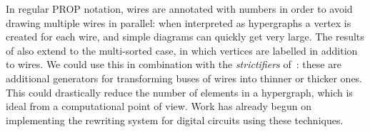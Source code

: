 In regular PROP notation, wires are annotated with numbers in order to avoid
drawing multiple wires in parallel: when interpreted as hypergraphs a vertex is
created for each wire, and simple diagrams can quickly get very large.
The results of \cite{bonchi2022stringa} also extend to the multi-sorted case, in
which vertices are labelled in addition to wires.
We could use this in combination with the \emph{strictifiers}
of~\cite{wilson2022string}: these are additional generators for transforming
buses of wires into thinner or thicker ones.
This could drastically reduce the number of elements in a hypergraph, which is
ideal from a computational point of view.
Work has already begun on implementing the rewriting system for digital circuits
using these techniques.